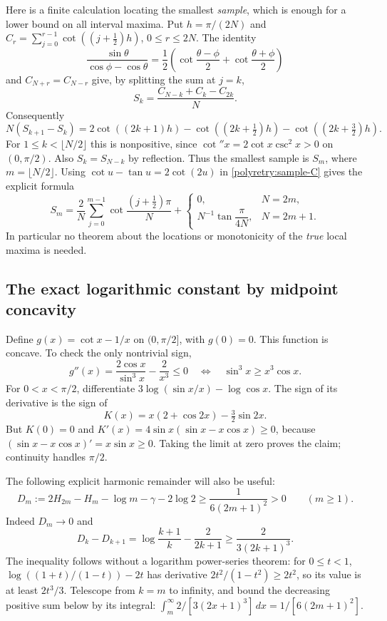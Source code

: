 \documentclass[11pt]{article}
\theoremstyle{remark}\newtheorem{remark}[theorem]{Remark}
\begin{document}
Here is a finite calculation locating the smallest \emph{sample},
which is enough for a lower bound on all interval maxima.  Put
$h=\pi/(2N)$ and
$C_r=\sum_{j=0}^{r-1}\cot((j+\tfrac12)h)$, $0\le r\le2N$.
The identity
\[
 \frac{\sin\theta}{\cos\phi-\cos\theta}
 =\frac12\left(\cot\frac{\theta-\phi}{2}
                  +\cot\frac{\theta+\phi}{2}\right)
\]
and $C_{N+r}=C_{N-r}$ give, by splitting the sum at $j=k$,
\begin{equation}\label{polyretry:sample-C}
 S_k=\frac{C_{N-k}+C_k-C_{2k}}N.
\end{equation}
Consequently
\[
 N(S_{k+1}-S_k)=2\cot((2k+1)h)
 -\cot((2k+\tfrac12)h)-\cot((2k+\tfrac32)h).
\]
For $1\le k<\lfloor N/2\rfloor$ this is nonpositive, since
$\cot''x=2\cot x\csc^2x>0$ on $(0,\pi/2)$.
Also $S_k=S_{N-k}$ by reflection.  Thus the smallest sample is
$S_m$, where $m=\lfloor N/2\rfloor$.
Using $\cot u-\tan u=2\cot(2u)$ in
\eqref{polyretry:sample-C} gives the explicit formula
\begin{equation}\label{polyretry:central-cot}
 S_m=\frac2N\sum_{j=0}^{m-1}
       \cot\frac{(j+\tfrac12)\pi}{N}
 +\begin{cases}
 0,&N=2m,\\[2pt]
 N^{-1}\tan\dfrac{\pi}{4N},&N=2m+1.
 \end{cases}
\end{equation}
In particular no theorem about the locations or monotonicity of the
\emph{true} local maxima is needed.

\subsection{The exact logarithmic constant by midpoint concavity}

Define $g(x)=\cot x-1/x$ on $(0,\pi/2]$, with $g(0)=0$.
This function is concave.  To check the only nontrivial sign,
\[
 g''(x)=\frac{2\cos x}{\sin^3x}-\frac2{x^3}\le0
 \quad\Longleftrightarrow\quad
 \sin^3x\ge x^3\cos x.
\]
For $0<x<\pi/2$, differentiate
$3\log(\sin x/x)-\log\cos x$.  The sign of its derivative is
the sign of
\[
 K(x)=x(2+\cos2x)-\tfrac32\sin2x.
\]
But $K(0)=0$ and
$K'(x)=4\sin x(\sin x-x\cos x)\ge0$, because
$(\sin x-x\cos x)'=x\sin x\ge0$.  Taking the limit at zero
proves the claim; continuity handles $\pi/2$.

The following explicit harmonic remainder will also be useful:
\begin{equation}\label{polyretry:harmonic-remainder}
 D_m:=2H_{2m}-H_m-\log m-\gamma-2\log2
 \ge\frac1{6(2m+1)^2}>0\qquad(m\ge1).
\end{equation}
Indeed $D_m\to0$ and
\[
 D_k-D_{k+1}
 =\log\frac{k+1}{k}-\frac2{2k+1}
 \ge\frac{2}{3(2k+1)^3}.
\]
The inequality follows without a logarithm power-series theorem:
for $0\le t<1$,
$\log((1+t)/(1-t))-2t$ has derivative
$2t^2/(1-t^2)\ge2t^2$, so its value is at least $2t^3/3$.
Telescope from $k=m$ to infinity, and bound the decreasing positive
sum below by its integral:
$\int_m^\infty2/[3(2x+1)^3]\,dx=1/[6(2m+1)^2]$.
\end{document}
